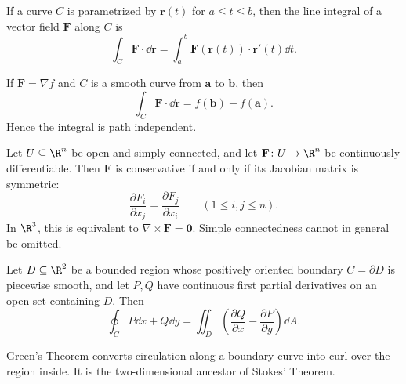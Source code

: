     \begin{definition}
        If a curve $C$ is parametrized by $\mathbf{r}(t)$ for $a\leq t\leq b$,
        then the line integral of a vector field $\mathbf{F}$ along $C$ is
        \[
            \int_C \mathbf{F}\cdot\dd\mathbf{r}
            =
            \int_a^b \mathbf{F}(\mathbf{r}(t))\cdot\mathbf{r}'(t)\dd t.
        \]
    \end{definition}

    \begin{theorem}
        If $\mathbf{F}=\nabla f$ and $C$ is a smooth curve from $\mathbf{a}$ to
        $\mathbf{b}$, then
        \[
            \int_C \mathbf{F}\cdot\dd\mathbf{r}
            =
            f(\mathbf{b})-f(\mathbf{a}).
        \]
        Hence the integral is path independent.
    \end{theorem}

    \begin{proposition}\label{pp:conservative}
        Let $U\subseteq\R^n$ be open and simply connected, and let
        $\mathbf{F}\colon U\to\R^n$ be continuously differentiable. Then
        $\mathbf{F}$ is conservative if and only if its Jacobian matrix is
        symmetric:
        \[
            \frac{\partial F_i}{\partial x_j}
            =
            \frac{\partial F_j}{\partial x_i}
            \qquad(1\leq i,j\leq n).
        \]
        In $\R^3$, this is equivalent to $\nabla\times\mathbf{F}=\mathbf{0}$.
        Simple connectedness cannot in general be omitted.
    \end{proposition}

    \begin{theorem}
        Let $D\subseteq\R^2$ be a bounded region whose positively oriented
        boundary $C=\partial D$ is piecewise smooth, and let $P,Q$ have
        continuous first partial derivatives on an open set containing $D$.
        Then
        \[
            \oint_C P\dd x+Q\dd y
            =
            \iint_D
            \left(
                \frac{\partial Q}{\partial x}
                -
                \frac{\partial P}{\partial y}
            \right)\dd A.
        \]
    \end{theorem}

    \begin{idea}
        Green's Theorem converts circulation along a boundary curve into curl
        over the region inside. It is the two-dimensional ancestor of Stokes'
        Theorem.
    \end{idea}


